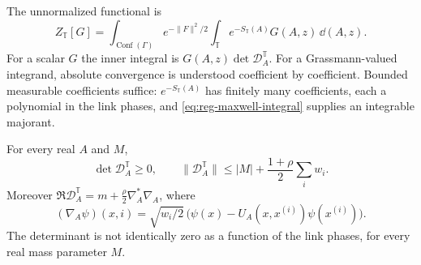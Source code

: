 The unnormalized functional is
\begin{equation}\label{eq:reg-functional}
 Z_{\mathbb T}[G]=\int_{\operatorname{Conf}(\Gamma)}
      e^{-\|F\|^2/2}\int_{\mathbb T}e^{-S_{\mathbb T}(A)}G(A,z)
      \,\dd(A,z).
\end{equation}
For a scalar $G$ the inner integral is
$G(A,z)\det \mathcal D_A^{\mathbb T}$. For a Grassmann-valued integrand,
absolute convergence is understood coefficient by coefficient.
Bounded measurable coefficients suffice: $e^{-S_{\mathbb T}(A)}$
has finitely many coefficients, each a polynomial in the link phases,
and \eqref{eq:reg-maxwell-integral} supplies an integrable majorant.

\begin{proposition}\label{prop:reg-determinant-sign}
For every real $A$ and $M$,
\[
 \det \mathcal D_A^{\mathbb T}\ge0,
 \qquad
 \|\mathcal D_A^{\mathbb T}\|\le |M|+\frac{1+\rho}{2}\sum_iw_i.
\]
Moreover $\Re \mathcal D_A^{\mathbb T}=m+\frac\rho2\nabla_A^*\nabla_A$, where
\[
 (\nabla_A\psi)(x,i)=\sqrt{w_i/2}\,
           \bigl(\psi(x)-U_A(x,x^{(i)})\psi(x^{(i)})\bigr).
\]
The determinant is not identically zero as a function of the link
phases, for every real mass parameter $M$.
\end{proposition}

